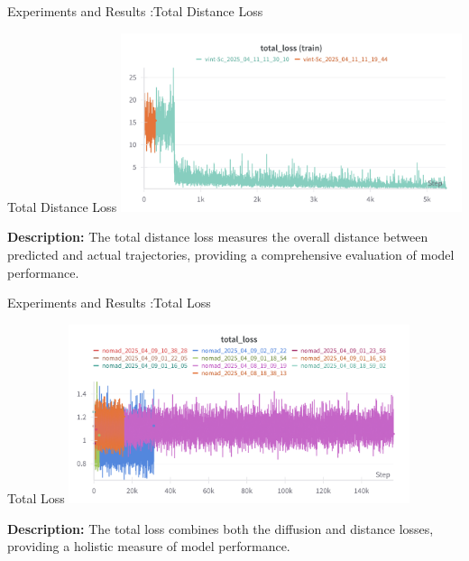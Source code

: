 \documentclass{beamer}
\begin{document}
\begin{frame}{Experiments and Results :Total Distance Loss}
    \begin{block}{Total Distance Loss}
        \centering
        \includegraphics[width=0.75\textwidth]{images/distloss_vint.png}
        
        \vspace{0.5em}
        \small
        \textbf{Description:} 
        The total distance loss measures the overall distance between predicted and actual trajectories, providing a comprehensive evaluation of model performance.
    \end{block}
\end{frame}

\begin{frame}{Experiments and Results :Total Loss}
    \begin{block}{Total Loss}
        \centering
        \includegraphics[width=0.75\textwidth]{images/totalloss_nomad.png}
        
        \vspace{0.5em}
        \small
        \textbf{Description:} 
        The total loss combines both the diffusion and distance losses, providing a holistic measure of model performance.
    \end{block}
\end{frame}
\end{document}
